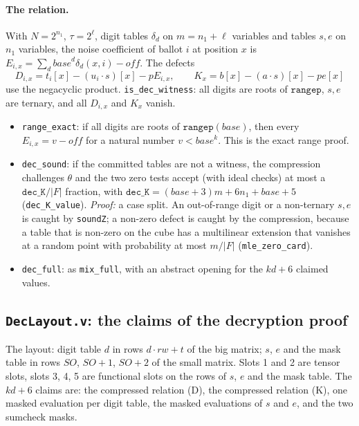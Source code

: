\documentclass[11pt,a4paper]{article}
\theoremstyle{definition}
\theoremstyle{plain}
\begin{document}
\paragraph{The relation.} With $N=2^{n_1}$, $\tau=2^{\ell}$, digit tables $\delta_d$ on $m=n_1+\ell$
variables and tables $s,e$ on $n_1$ variables, the noise coefficient of ballot $i$ at position $x$
is $E_{i,x}=\sum_d\mathit{base}^d\delta_d(x,i)-\mathit{off}$. The defects
\[
  D_{i,x}=t_i[x]-(u_i\cdot s)[x]-pE_{i,x},\qquad K_x=b[x]-(a\cdot s)[x]-pe[x]
\]
use the negacyclic product. \texttt{is\_dec\_witness}: all digits are roots of $\mathtt{rangep}$, $s,e$
are ternary, and all $D_{i,x}$ and $K_x$ vanish.
\begin{itemize}[leftmargin=1.3em]
\item \texttt{range\_exact}: if all digits are roots of $\mathtt{rangep}(\mathit{base})$, then every
  $E_{i,x}=v-\mathit{off}$ for a natural number $v<\mathit{base}^{k}$. This is the exact range proof.
\item \texttt{dec\_sound}: if the committed tables are not a witness, the compression challenges
  $\theta$ and the two zero tests accept (with ideal checks) at most a $\mathtt{dec\_K}/|F|$
  fraction, with $\mathtt{dec\_K}=(\mathit{base}+3)m+6n_1+\mathit{base}+5$ (\texttt{dec\_K\_value}).
  \emph{Proof:} a case split. An out-of-range digit or a non-ternary $s,e$ is caught by \texttt{soundZ};
  a non-zero defect is caught by the compression, because a table that is non-zero on the cube has
  a multilinear extension that vanishes at a random point with probability at most $m/|F|$
  (\texttt{mle\_zero\_card}).
\item \texttt{dec\_full}: as \texttt{mix\_full}, with an abstract opening for the $kd+6$ claimed values.
\end{itemize}

\subsection{\texttt{DecLayout.v}: the claims of the decryption proof}

The layout: digit table $d$ in rows $d\cdot rw+t$ of the big matrix; $s$, $e$ and the mask table in
rows $SO$, $SO+1$, $SO+2$ of the small matrix. Slots 1 and 2 are tensor slots, slots 3, 4, 5 are
functional slots on the rows of $s$, $e$ and the mask table. The $kd+6$ claims are: the compressed
relation (D), the compressed relation (K), one masked evaluation per digit table, the masked
evaluations of $s$ and $e$, and the two sumcheck masks.
\end{document}

